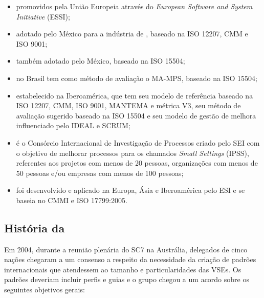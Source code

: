 \begin{itemize}

\item[\textbf{SPIRE\footnotemark e TOPS\footnotemark}] promovidos pela União Europeia através do \textit{European Software and System Initiative} (ESSI);

\item[\textbf{MoProSoft}] adotado pelo México para a indústria de \sw, baseado na ISO 12207, CMM e ISO 9001;

\item[\textbf{EvalProSoft}] também adotado pelo México, baseado na ISO 15504;

\item[\textbf{MPS-BR}] no Brasil tem como método de avaliação o MA-MPS, baseado na ISO 15504;

\item[\textbf{COMPETISOFT}] estabelecido na Iberoamérica, que tem seu modelo de referência baseado na ISO 12207, CMM, ISO 9001, MANTEMA  e métrica V3, seu método de avaliação sugerido baseado na ISO 15504 e seu modelo de gestão de melhora influenciado pelo IDEAL e SCRUM;

\item[\textbf{IPRC}] é o Consórcio Internacional de Investigação de Processos criado pelo SEI com o objetivo de melhorar processos para os chamados \textit{Small Settings} (IPSS), referentes aos projetos com menos de 20 pessoas, organizações com menos de 50 pessoas e/ou empresas com menos de 100 pessoas;

\item[\textbf{I.T.Mark}] foi desenvolvido e aplicado na Europa, Ásia e Iberoamérica pelo ESI e se baseia no CMMI e ISO 17799:2005.

\end{itemize}



\subsection{História da \iso}

Em 2004, durante a reunião plenária do SC7\footnotemark{} na Austrália, delegados de cinco nações chegaram a um consenso a respeito da necessidade da criação de padrões internacionais que atendessem ao tamanho e particularidades das VSEs. Os padrões deveriam incluir perfis e guias e o grupo chegou a um acordo sobre os seguintes objetivos gerais:

